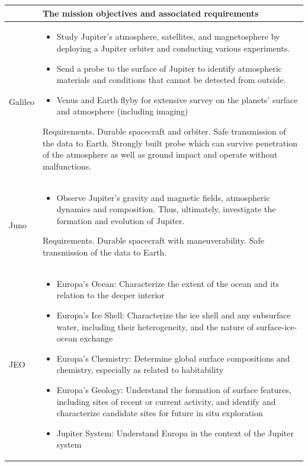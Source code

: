 \begin{supertabular}{p{.1\textwidth}p{.9\textwidth}}
  & The mission objectives and associated requirements \\
  \hline

  Galileo &
  \begin{itemize}
  \item Study Jupiter’s atmosphere, satellites, and magnetosphere
    by deploying a Jupiter orbiter and conducting various
    experiments.
  \item Send a probe to the surface of Jupiter to identify
    atmospheric materials and conditions that cannot be detected
    from outside.
  \item Venus and Earth flyby for extensive survey on the planets’
    surface and atmosphere (including imaging)
  \end{itemize}
  Requirements. Durable spacecraft and orbiter. Safe
  transmission of the data to Earth.  Strongly built probe
  which can survive penetration of the atmosphere as well as
  ground impact and operate without malfunctions. \\

  Juno &
  \begin{itemize}
  \item Observe Jupiter's gravity and magnetic fields, atmospheric
    dynamics and composition. Thus, ultimately, investigate the
    formation and evolution of Jupiter.
  \end{itemize}

  Requirements. Durable spacecraft with maneuverability. Safe
  transmission of the data to Earth. \\

  JEO &
  \begin{itemize}
  \item Europa’s Ocean: Characterize the extent of the ocean and its
    relation to the deeper interior
  \item Europa’s Ice Shell: Characterize the ice shell and any
    subsurface water, including their heterogeneity, and the nature of
    surface-ice-ocean exchange
  \item Europa’s Chemistry: Determine global surface compositions and
    chemistry, especially as related to habitability
  \item Europa’s Geology: Understand the formation of surface
    features, including sites of recent or current activity, and
    identify and characterize candidate sites for future in situ
    exploration
  \item Jupiter System: Understand Europa in the context of the
    Jupiter system
  \end{itemize} \\


\end{supertabular}
